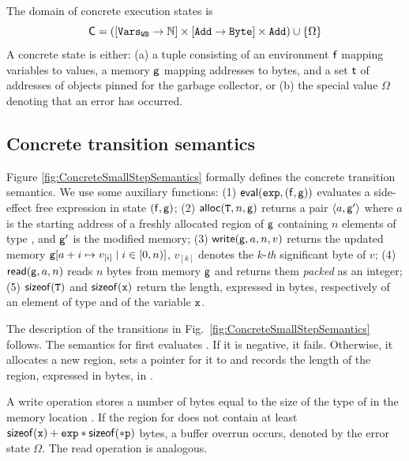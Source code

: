 \documentclass[10pt]{sigplanconf}
\begin{document}
The domain of concrete execution states is
$$\mathsf{C} =
([\mathtt{Vars}_{\mathtt{WB}} \rightarrow\mathbb{N}] \times
[\mathtt{Add} \rightarrow\mathtt{Byte}] \times \mathtt{Add}) \cup \{ \Omega \}
$$
A concrete state is either: (a) a tuple consisting of an environment $\mathsf{f}$ mapping
variables to values, a memory $\mathsf{g}$ mapping addresses to bytes, and
a set $\mathsf{t}$ of addresses of objects pinned for the garbage collector, or
(b) the special value $\Omega$ denoting that
an error has occurred.


\subsection{Concrete transition  semantics}
Figure \ref{fig:ConcreteSmallStepSemantics} formally defines the
concrete transition semantics.  We use some auxiliary functions: (1)
$\mathsf{eval}(\mathtt{exp}, (\mathsf{f},\mathsf{g}))$ evaluates a
side-effect free expression  in state
$(\mathsf{f},\mathsf{g})$; (2) $\mathsf{alloc}(\mathtt{T},n,\mathsf{g})$ returns
a pair $\langle a, \mathsf{g}' \rangle$ where $a$ is the starting address of
a freshly allocated region of $\mathsf{g}$ containing $n$ elements
of type , and $\mathsf{g}'$ is the modified memory; (3)
$\mathsf{write}\allowbreak(\mathsf{g}, \allowbreak  a,\allowbreak  n,\allowbreak  v)$ returns the updated memory
$\mathsf{g}[a + i \mapsto v_{[i]} \mid i \in [0,n)]$, $v_{[k]}$
denotes the $k$-\textit{th} significant byte of $v$; (4)
$\mathsf{read}\allowbreak(\mathsf{g}, \allowbreak  a,\allowbreak n)$ reads $n$ bytes from memory
$\mathsf{g}$ and returns them \emph{packed} as an integer; (5)
$\mathsf{sizeof}(\mathtt{\mathtt{T}})$ and $\mathsf{sizeof}(\mathtt{\mathtt{x}})$ return the length,
expressed in bytes, respectively of an element of type  and of
the variable $\mathtt{x}$.


The  description of the transitions in Fig.~\ref{fig:ConcreteSmallStepSemantics} follows.
The  semantics  for  first evaluates .
If it is negative, it fails.
Otherwise, it allocates a new region, sets a pointer for it to  and records the length of the region, expressed in bytes, in .

A write operation  stores a number of bytes equal to the size of the type of  in the memory location . 
If the region for  does not contain at least $\mathsf{sizeof}(\mathtt{\mathtt{x}})+\mathtt{exp}*\mathsf{sizeof}(\mathtt{*p})$ bytes, a buffer overrun occurs, denoted by the error state $\Omega$.
The read operation is analogous.
\end{document}
